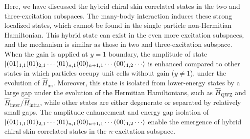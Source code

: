 \documentclass[longbibliography, aps, prx, amsmath, amssymb, amsfonts, twocolumn,superscriptaddress, footinbib]{revtex4-1}
\begin{document}
	Here, we have discussed the hybrid chiral skin correlated states in the two and three-excitation subspaces. The many-body interaction induces these strong localized states, which cannot be found in the single particle non-Hermitian Hamiltonian. This hybrid state can exist in the even more excitation subspaces, and the mechanism is similar as those in two and three-excitation subspace. 
	When the gain is applied at $y=1$ boundary, the amplitude of state $\ket{(01)_{1,1}(01)_{2,1}\cdots(01)_{n,1}(00)_{n+1,1}\cdots(00)_{1,2}\cdots}$ is enhanced compared to other states in which particles occupy unit cells without gain ($y\neq 1$), under the evolution of $\hat{H}_{\text{im}}$. Moreover, this state is isolated from lower-energy states by a large gap under the evolution of the Hermitian Hamiltonians, such as $\hat{H}_{\text{QWZ}}$ and $\hat{H}_{\text{inter}}/\hat{H}_{\text{intra}}$, while other states are either degenerate or separated by relatively small gaps. The amplitude enhancement and energy gap isolation of $\ket{(01)_{1,1}(01)_{2,1}\cdots(01)_{n,1}(00)_{n+1,1}\cdots(00)_{1,2}\cdots}$ enable the emergence of hybrid chiral skin correlated states in the $n$-excitation subspace. 

\end{document}
